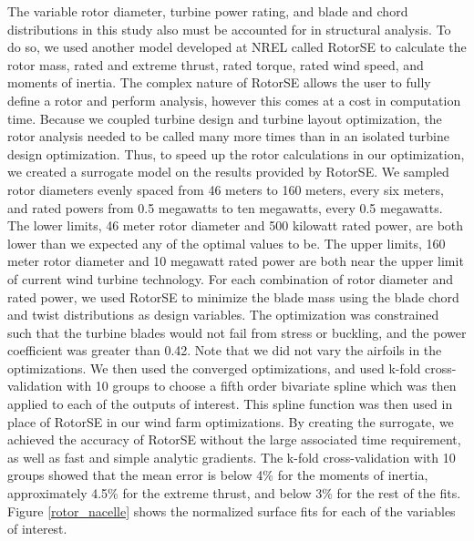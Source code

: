 \label{rotor_nacelle}

The variable rotor diameter, turbine power rating, and blade and chord distributions in this study also must be accounted for in structural analysis.  To do so, we used another model developed at NREL called RotorSE \citep{ning2013rotorse} to calculate the rotor mass, rated and extreme thrust, rated torque, rated wind speed, and moments of inertia. The complex nature of RotorSE allows the user to fully define a rotor and perform analysis, however this comes at a cost in computation time. Because we coupled turbine design and turbine layout optimization, the rotor analysis needed to be called many more times than in an isolated turbine design optimization. 
Thus, to speed up the rotor calculations in our optimization, we created a surrogate model on the results provided by RotorSE. We sampled rotor diameters evenly spaced from 46 meters to 160 meters, every six meters, and rated powers from 0.5 megawatts to ten megawatts, every 0.5 megawatts. The lower limits, 46 meter rotor diameter and 500 kilowatt rated power, are both lower than we expected any of the optimal values to be. The upper limits, 160 meter rotor diameter and 10 megawatt rated power are both near the upper limit of current wind turbine technology. For each combination of rotor diameter and rated power, we used RotorSE to minimize the blade mass using the blade chord and twist distributions as design variables. The optimization was constrained such that the turbine blades would not fail from stress or buckling, and the power coefficient was greater than 0.42. Note that we did not vary the airfoils in the optimizations. 
We then used the converged optimizations, and used k-fold cross-validation with 10 groups to choose a fifth order bivariate spline which was then applied to each of the outputs of interest. This spline function was then used in place of RotorSE in our wind farm optimizations. By creating the surrogate, we achieved the accuracy of RotorSE without the large associated time requirement, as well as fast and simple analytic gradients. 
The k-fold cross-validation with 10 groups showed that the mean error is below 4\% for the moments of inertia, approximately 4.5\% for the extreme thrust, and below 3\% for the rest of the fits. 
Figure \ref{rotor_nacelle} shows the normalized surface fits for each of the variables of interest.


